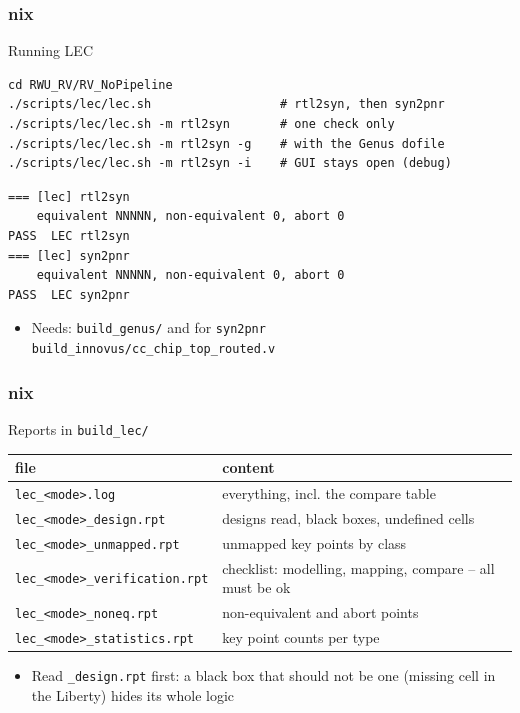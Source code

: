 \documentclass{beamer}
\newcommand{\astitle}{nix}
\newcommand{\assubtitle}{nix}
\newcommand{\cmd}[1]{\texttt{#1}}
\begin{document}
\renewcommand{\assubtitle}{Running LEC}
\begin{frame}[fragile]
\frametitle{\astitle}
\begin{block}{\assubtitle}
\begin{lstlisting}[style=sh]
cd RWU_RV/RV_NoPipeline
./scripts/lec/lec.sh                  # rtl2syn, then syn2pnr
./scripts/lec/lec.sh -m rtl2syn       # one check only
./scripts/lec/lec.sh -m rtl2syn -g    # with the Genus dofile
./scripts/lec/lec.sh -m rtl2syn -i    # GUI stays open (debug)
\end{lstlisting}
\begin{lstlisting}[style=out]
=== [lec] rtl2syn
    equivalent NNNNN, non-equivalent 0, abort 0
PASS  LEC rtl2syn
=== [lec] syn2pnr
    equivalent NNNNN, non-equivalent 0, abort 0
PASS  LEC syn2pnr
\end{lstlisting}
  \begin{itemize}
    \item Needs: \cmd{build\_genus/} and for \cmd{syn2pnr}
      \cmd{build\_innovus/cc\_chip\_top\_routed.v}
  \end{itemize}
\end{block}
\end{frame}

\renewcommand{\assubtitle}{Reports in \texttt{build\_lec/}}
\begin{frame}
\frametitle{\astitle}
\begin{block}{\assubtitle}
  \footnotesize
  \begin{tabularx}{\linewidth}{@{}lY@{}}
    \textbf{file} & \textbf{content}\\\hline
    \cmd{lec\_<mode>.log}              & everything, incl. the compare table\\
    \cmd{lec\_<mode>\_design.rpt}      & designs read, black boxes,
                                         undefined cells\\
    \cmd{lec\_<mode>\_unmapped.rpt}    & unmapped key points by class\\
    \cmd{lec\_<mode>\_verification.rpt} & checklist: modelling, mapping,
                                         compare -- all must be ok\\
    \cmd{lec\_<mode>\_noneq.rpt}       & non-equivalent and abort points\\
    \cmd{lec\_<mode>\_statistics.rpt}  & key point counts per type\\
  \end{tabularx}
  \vspace{4pt}
  \begin{itemize}
    \item Read \cmd{\_design.rpt} first: a black box that should not be
      one (missing cell in the Liberty) hides its whole logic
  \end{itemize}
\end{block}
\end{frame}
\end{document}
